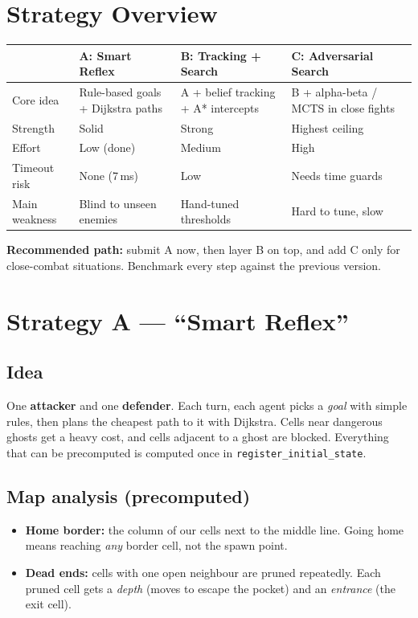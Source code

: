 \documentclass[11pt,a4paper]{article}
\begin{document}
\section{Strategy Overview}

\begin{center}
\begin{tabularx}{\linewidth}{@{}lXXX@{}}
\toprule
 & \textbf{A: Smart Reflex} & \textbf{B: Tracking + Search} & \textbf{C: Adversarial Search} \\
\midrule
Core idea & Rule-based goals + Dijkstra paths & A + belief tracking + A* intercepts & B + alpha-beta / MCTS in close fights \\
Strength & Solid & Strong & Highest ceiling \\
Effort & Low (done) & Medium & High \\
Timeout risk & \textcolor{good}{None (7\,ms)} & \textcolor{good}{Low} & \textcolor{warn}{Needs time guards} \\
Main weakness & Blind to unseen enemies & Hand-tuned thresholds & Hard to tune, slow \\
\bottomrule
\end{tabularx}
\end{center}

\noindent\textbf{Recommended path:} submit A now, then layer B on top, and add C only for
close-combat situations. Benchmark every step against the previous version.

\section{Strategy A --- ``Smart Reflex''}

\subsection{Idea}
One \textbf{attacker} and one \textbf{defender}. Each turn, each agent picks a \emph{goal} with simple
rules, then plans the cheapest path to it with Dijkstra. Cells near dangerous ghosts get a heavy
cost, and cells adjacent to a ghost are blocked. Everything that can be precomputed is computed once
in \texttt{register\_initial\_state}.

\subsection{Map analysis (precomputed)}
\begin{itemize}
  \item \textbf{Home border:} the column of our cells next to the middle line. Going home means reaching
        \emph{any} border cell, not the spawn point.
  \item \textbf{Dead ends:} cells with one open neighbour are pruned repeatedly. Each pruned cell
        gets a \emph{depth} (moves to escape the pocket) and an \emph{entrance} (the exit cell).
\end{itemize}
\end{document}
